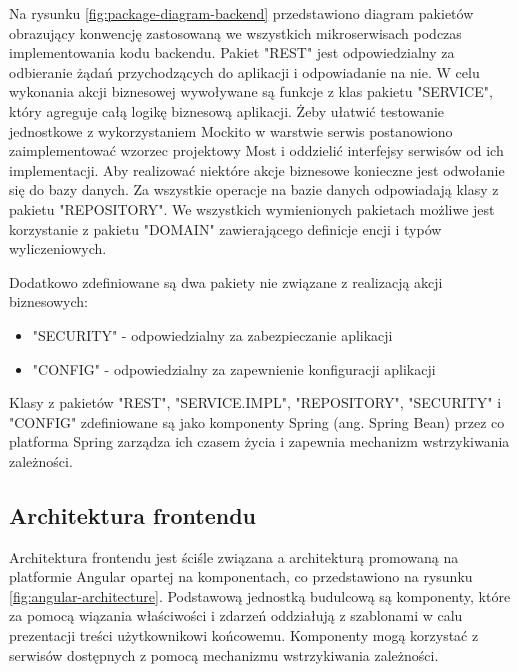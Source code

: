 \noindent
{}

Na rysunku \ref{fig:package-diagram-backend} przedstawiono diagram pakietów obrazujący konwencję zastosowaną we wszystkich mikroserwisach podczas implementowania kodu backendu.
Pakiet "REST" jest odpowiedzialny za odbieranie żądań przychodzących do aplikacji i odpowiadanie na nie.
W celu wykonania akcji biznesowej wywoływane są funkcje z klas pakietu "SERVICE", który agreguje całą logikę biznesową aplikacji.
Żeby ułatwić testowanie jednostkowe z wykorzystaniem Mockito w warstwie serwis postanowiono zaimplementować wzorzec projektowy Most\cite{book:wzorce-projektowe} i oddzielić interfejsy serwisów od ich implementacji.
Aby realizować niektóre akcje biznesowe konieczne jest odwołanie się do bazy danych.
Za wszystkie operacje na bazie danych odpowiadają klasy z pakietu "REPOSITORY".
We wszystkich wymienionych pakietach możliwe jest korzystanie z pakietu "DOMAIN" zawierającego definicje encji i typów wyliczeniowych.

\par
Dodatkowo zdefiniowane są dwa pakiety nie związane z realizacją akcji biznesowych:
\begin{itemize}
    \item "SECURITY" - odpowiedzialny za zabezpieczanie aplikacji
    \item "CONFIG" - odpowiedzialny za zapewnienie konfiguracji aplikacji
\end{itemize}

\par
Klasy z pakietów "REST", "SERVICE.IMPL", "REPOSITORY", "SECURITY" i "CONFIG" zdefiniowane są jako komponenty Spring (ang. Spring Bean) przez co platforma Spring zarządza ich czasem życia i zapewnia mechanizm wstrzykiwania zależności\cite{book:spring-w-akcji}.

\subsection{Architektura frontendu}\label{subsec:system-architecture:frontend}

\noindent
{}

Architektura frontendu jest ściśle związana a architekturą promowaną na platformie Angular opartej na komponentach,
co przedstawiono na rysunku \ref{fig:angular-architecture}.
Podstawową jednostką budulcową są komponenty, które za pomocą wiązania właściwości i zdarzeń oddziałują z szablonami w calu prezentacji treści użytkownikowi końcowemu.
Komponenty mogą korzystać z serwisów dostępnych z pomocą mechanizmu wstrzykiwania zależności.

